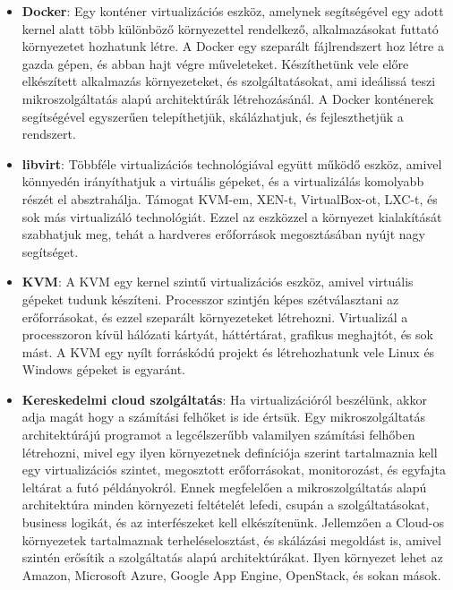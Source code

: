 \documentclass[11pt,magyar,a4paper,twoside,]{report}
\begin{document}
\begin{itemize}
\item
  \textbf{Docker}\citep{docker}: Egy konténer virtualizációs eszköz,
  amelynek segítségével egy adott kernel alatt több különböző
  környezettel rendelkező, alkalmazásokat futtató környezetet hozhatunk
  létre. A Docker egy szeparált fájlrendszert hoz létre a gazda gépen,
  és abban hajt végre műveleteket. Készíthetünk vele előre elkészített
  alkalmazás környezeteket, és szolgáltatásokat, ami ideálissá teszi
  mikroszolgáltatás alapú architektúrák létrehozásánál. A Docker
  konténerek segítségével egyszerűen telepíthetjük, skálázhatjuk, és
  fejleszthetjük a rendszert.
\item
  \textbf{libvirt}\citep{libvirt}: Többféle virtualizációs
  technológiával együtt működő eszköz, amivel könnyedén irányíthatjuk a
  virtuális gépeket, és a virtualizálás komolyabb részét el
  absztrahálja. Támogat KVM-em, XEN-t, VirtualBox-ot, LXC-t, és sok más
  virtualizáló technológiát. Ezzel az eszközzel a környezet kialakítását
  szabhatjuk meg, tehát a hardveres erőforrások megosztásában nyújt nagy
  segítséget.
\item
  \textbf{KVM}\citep{kvm}: A KVM egy kernel szintű virtualizációs
  eszköz, amivel virtuális gépeket tudunk készíteni. Processzor szintjén
  képes szétválasztani az erőforrásokat, és ezzel szeparált
  környezeteket létrehozni. Virtualizál a processzoron kívül hálózati
  kártyát, háttértárat, grafikus meghajtót, és sok mást. A KVM egy nyílt
  forráskódú projekt és létrehozhatunk vele Linux és Windows gépeket is
  egyaránt.
\item
  \textbf{Kereskedelmi cloud szolgáltatás}: Ha virtualizációról
  beszélünk, akkor adja magát hogy a számítási felhőket is ide értsük.
  Egy mikroszolgáltatás architektúrájú programot a legcélszerűbb
  valamilyen számítási felhőben létrehozni, mivel egy ilyen környezetnek
  definíciója szerint tartalmaznia kell egy virtualizációs szintet,
  megosztott erőforrásokat, monitorozást, és egyfajta leltárat a futó
  példányokról. Ennek megfelelően a mikroszolgáltatás alapú architektúra
  minden környezeti feltételét lefedi, csupán a szolgáltatásokat,
  business logikát, és az interfészeket kell elkészítenünk. Jellemzően a
  Cloud-os környezetek tartalmaznak terheléselosztást, és skálázási
  megoldást is, amivel szintén erősítik a szolgáltatás alapú
  architektúrákat. Ilyen környezet lehet az Amazon, Microsoft Azure,
  Google App Engine, OpenStack, és sokan mások.
\end{itemize}
\end{document}
